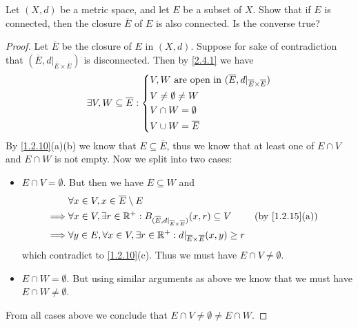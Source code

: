 \begin{ex}\label{ex:2.4.8}
  Let \((X, d)\) be a metric space, and let \(E\) be a subset of \(X\).
  Show that if \(E\) is connected, then the closure \(\overline{E}\) of \(E\) is also connected.
  Is the converse true?
\end{ex}

\begin{proof}
  Let \(\overline{E}\) be the closure of \(E\) in \((X, d)\).
  Suppose for sake of contradiction that \((\overline{E}, d|_{\overline{E} \times \overline{E}})\) is disconnected.
  Then by \cref{2.4.1} we have
  \[
    \exists V, W \subseteq \overline{E} : \begin{dcases}
      V, W \text{ are open in } (\overline{E}, d|_{\overline{E} \times \overline{E}}) \\
      V \neq \emptyset \neq W                                                         \\
      V \cap W = \emptyset                                                            \\
      V \cup W = \overline{E}
    \end{dcases}
  \]
  By \cref{1.2.10}(a)(b) we know that \(E \subseteq \overline{E}\), thus we know that at least one of \(E \cap V\) and \(E \cap W\) is not empty.
  Now we split into two cases:
  \begin{itemize}
    \item \(E \cap V = \emptyset\).
          But then we have \(E \subseteq W\) and
          \begin{align*}
                     & \forall x \in V, x \in \overline{E} \setminus E                                                                                                     \\
            \implies & \forall x \in V, \exists r \in \R^+ : B_{(\overline{E}, d|_{\overline{E} \times \overline{E}})}(x, r) \subseteq V &  & \text{(by \cref{1.2.15}(a))} \\
            \implies & \forall y \in E, \forall x \in V, \exists r \in \R^+ : d|_{\overline{E} \times \overline{E}}(x, y) \geq r
          \end{align*}
          which contradict to \cref{1.2.10}(c).
          Thus we must have \(E \cap V \neq \emptyset\).
    \item \(E \cap W = \emptyset\).
          But using similar arguments as above we know that we must have \(E \cap W \neq \emptyset\).
  \end{itemize}
  From all cases above we conclude that \(E \cap V \neq \emptyset \neq E \cap W\).

\end{proof}
